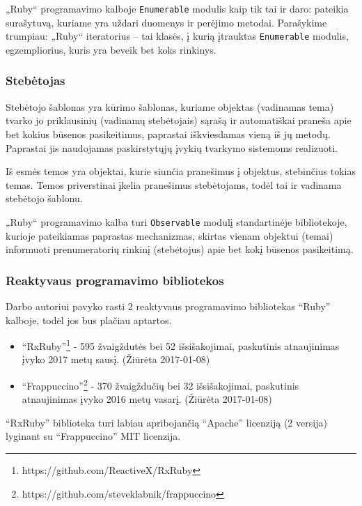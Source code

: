 „Ruby“ programavimo kalboje \lstinline|Enumerable| modulis kaip tik tai ir daro: pateikia surašytuvą, kuriame yra uždari duomenys ir perėjimo metodai. Parašykime trumpiau: „Ruby“ iteratorius – tai klasės, į kurią įtrauktas \lstinline|Enumerable| modulis, egzempliorius, kuris yra beveik bet koks rinkinys.

\subsubsection{Stebėtojas}

Stebėtojo šablonas yra kūrimo šablonas, kuriame objektas (vadinamas tema) tvarko jo priklausinių (vadinamų stebėtojais) sąrašą ir automatiškai praneša apie bet kokius būsenos pasikeitimus, paprastai iškviesdamas vieną iš jų metodų. Paprastai jis naudojamas paskirstytųjų įvykių tvarkymo sistemoms realizuoti.

Iš esmės temos yra objektai, kurie siunčia pranešimus į objektus, stebinčius tokias temas. Temos priverstinai įkelia pranešimus stebėtojams, todėl tai ir vadinama stebėtojo šablonu.

„Ruby“ programavimo kalba turi \lstinline|Observable| modulį standartinėje bibliotekoje, kurioje pateikiamas paprastas mechanizmas, skirtas vienam objektui (temai) informuoti prenumeratorių rinkinį (stebėtojus) apie bet kokį būsenos pasikeitimą.

\subsubsection{Reaktyvaus programavimo bibliotekos}

Darbo autoriui pavyko rasti 2 reaktyvaus programavimo bibliotekas ``Ruby'' kalboje, todėl jos bus plačiau aptartos.

\begin{itemize}
  \item ``RxRuby''\footnote{https://github.com/ReactiveX/RxRuby} - 595 žvaigždutės bei 52 išsišakojimai, paskutinis atnaujinimas įvyko 2017 metų sausį. (Žiūrėta 2017-01-08)

  \item ``Frappuccino''\footnote{https://github.com/steveklabnik/frappuccino} - 370 žvaigždučių bei 32 išsišakojimai, paskutinis atnaujinimas įvyko 2016 metų vasarį. (Žiūrėta 2017-01-08)
\end{itemize}

``RxRuby'' biblioteka turi labiau apribojančią ``Apache'' licenziją (2 versija) lyginant su ``Frappuccino'' MIT licenzija.

